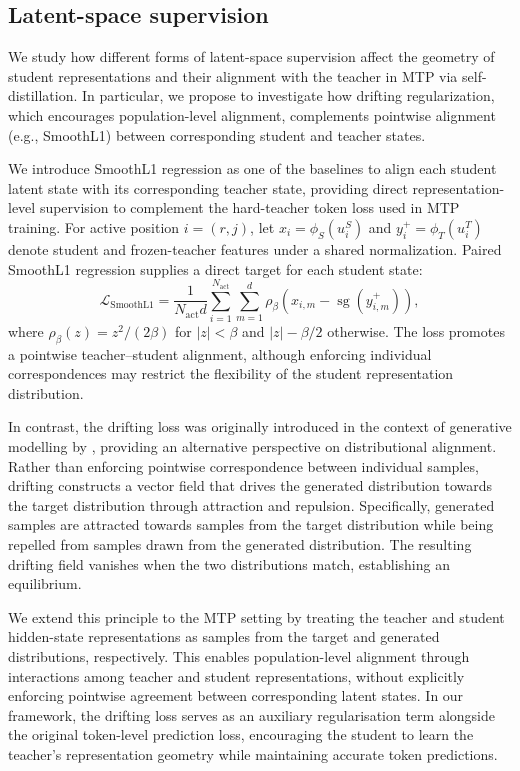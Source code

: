 \documentclass{article}
\begin{document}
\subsection{Latent-space supervision}
\label{sec:latent}
We study how different forms of latent-space supervision affect the geometry of student representations and their alignment with the teacher in MTP via self-distillation. In particular, we propose to investigate how drifting regularization, which encourages population-level alignment, complements pointwise alignment (e.g., SmoothL1) between corresponding student and teacher states. 


We introduce SmoothL1 regression as one of the baselines to align each student latent state with its corresponding teacher state, providing direct representation-level supervision to complement the hard-teacher token loss used in MTP training. For active position $i=(r,j)$, let $x_i=\phi_S(u_i^S)$ and $y_i^+=\phi_T(u_i^T)$ denote student and frozen-teacher features under a shared normalization. Paired SmoothL1 regression supplies a direct target for each student state:
\begin{equation}
 \mathcal L_{\mathrm{SmoothL1}}=\frac{1}{N_{\mathrm{act}}d}
 \sum_{i=1}^{N_{\mathrm{act}}}\sum_{m=1}^{d}
 \rho_\beta\!\left(x_{i,m}-\operatorname{sg}(y^+_{i,m})\right),
\end{equation}
where $\rho_\beta(z)=z^2/(2\beta)$ for $|z|<\beta$ and $|z|-\beta/2$ otherwise. The loss promotes a pointwise teacher--student alignment, although enforcing individual correspondences may restrict the flexibility of the student representation distribution.



In contrast, the drifting loss was originally introduced in the context of generative modelling by \citet{deng2026drifting}, providing an alternative perspective on distributional alignment. Rather than enforcing pointwise correspondence between individual samples, drifting constructs a vector field that drives the generated distribution towards the target distribution through attraction and repulsion. Specifically, generated samples are attracted towards samples from the target distribution while being repelled from samples drawn from the generated distribution. The resulting drifting field vanishes when the two distributions match, establishing an equilibrium.

We extend this principle to the MTP setting by treating the teacher and student hidden-state representations as samples from the target and generated distributions, respectively. This enables population-level alignment through interactions among teacher and student representations, without explicitly enforcing pointwise agreement between corresponding latent states. In our framework, the drifting loss serves as an auxiliary regularisation term alongside the original token-level prediction loss, encouraging the student to learn the teacher's representation geometry while maintaining accurate token predictions.
\end{document}
